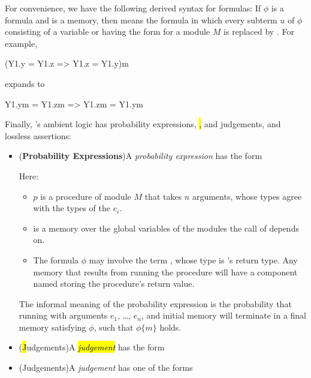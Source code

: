 For convenience, we have the following derived syntax for formulas: If
$\phi$ is a formula and  is a memory, then
 means the formula in which every subterm $u$ of
$\phi$ consisting of a variable or having the form  for
a module $M$ is replaced by .
For example,
\begin{easycrypt}{}{}
(Y1.y = Y1.z => Y1.z = Y1.y){m}
\end{easycrypt}
expands to
\begin{easycrypt}{}{}
Y1.y{m} = Y1.z{m} => Y1.z{m} = Y1.y{m}
\end{easycrypt}

Finally, \EasyCrypt's ambient logic has probability expressions, \hl,
\phl and \prhl judgements, and lossless assertions:
\begin{itemize}
\item (\textbf{Probability Expressions})\quad A \emph{probability expression}
  has the form
  \begin{center}
  \end{center}
Here:
\begin{itemize}
\item $p$ is a procedure of module $M$ that takes $n$ arguments, whose
types agree with the types of the $e_i$.

\item {} is a memory over the global variables of the modules
  the call of  depends on.

\item The formula $\phi$ may involve the term , whose
  type is 's return type. Any memory that results
  from running the procedure will have a component named 
  storing the procedure's return value.
\end{itemize}
The informal meaning of the probability expression is
the probability that running  with arguments
$e_1$, \ldots, $e_n$, and initial memory  will terminate
in a final memory  satisfying $\phi$, such that
$\phi\{m\}$ holds.

\item (\hl Judgements)\quad A \hl \emph{judgement} has the form
  \begin{center}
  \end{center}

\item (\phl Judgements)\quad A \phl \emph{judgement} has one of the forms
  \begin{center}
     \\
     \\
  \end{center}


\end{itemize}
